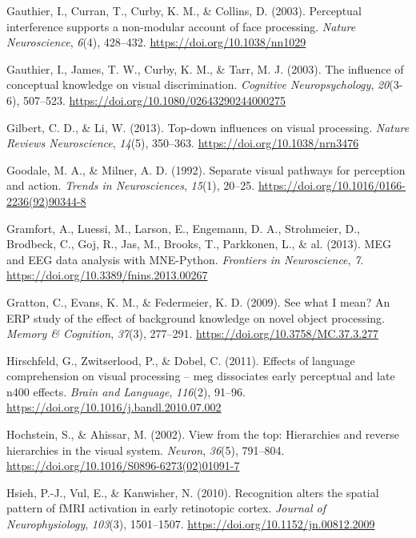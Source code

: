\documentclass[
  english,
  man,floatsintext]{apa7}
\begin{document}
\leavevmode\hypertarget{ref-gauthier2003a}{}%
Gauthier, I., Curran, T., Curby, K. M., \& Collins, D. (2003). Perceptual interference supports a non-modular account of face processing. \emph{Nature Neuroscience}, \emph{6}(4), 428--432. \url{https://doi.org/10.1038/nn1029}

\leavevmode\hypertarget{ref-gauthier2003}{}%
Gauthier, I., James, T. W., Curby, K. M., \& Tarr, M. J. (2003). The influence of conceptual knowledge on visual discrimination. \emph{Cognitive Neuropsychology}, \emph{20}(3-6), 507--523. \url{https://doi.org/10.1080/02643290244000275}

\leavevmode\hypertarget{ref-gilbert2013}{}%
Gilbert, C. D., \& Li, W. (2013). Top-down influences on visual processing. \emph{Nature Reviews Neuroscience}, \emph{14}(5), 350--363. \url{https://doi.org/10.1038/nrn3476}

\leavevmode\hypertarget{ref-goodale1992}{}%
Goodale, M. A., \& Milner, A. D. (1992). Separate visual pathways for perception and action. \emph{Trends in Neurosciences}, \emph{15}(1), 20--25. \url{https://doi.org/10.1016/0166-2236(92)90344-8}

\leavevmode\hypertarget{ref-gramfort2013}{}%
Gramfort, A., Luessi, M., Larson, E., Engemann, D. A., Strohmeier, D., Brodbeck, C., Goj, R., Jas, M., Brooks, T., Parkkonen, L., \& al. (2013). MEG and EEG data analysis with MNE-Python. \emph{Frontiers in Neuroscience}, \emph{7}. \url{https://doi.org/10.3389/fnins.2013.00267}

\leavevmode\hypertarget{ref-gratton2009}{}%
Gratton, C., Evans, K. M., \& Federmeier, K. D. (2009). See what I mean? An ERP study of the effect of background knowledge on novel object processing. \emph{Memory \& Cognition}, \emph{37}(3), 277--291. \url{https://doi.org/10.3758/MC.37.3.277}

\leavevmode\hypertarget{ref-hirschfeld2011}{}%
Hirschfeld, G., Zwitserlood, P., \& Dobel, C. (2011). Effects of language comprehension on visual processing -- meg dissociates early perceptual and late n400 effects. \emph{Brain and Language}, \emph{116}(2), 91--96. \url{https://doi.org/10.1016/j.bandl.2010.07.002}

\leavevmode\hypertarget{ref-hochstein2002}{}%
Hochstein, S., \& Ahissar, M. (2002). View from the top: Hierarchies and reverse hierarchies in the visual system. \emph{Neuron}, \emph{36}(5), 791--804. \url{https://doi.org/10.1016/S0896-6273(02)01091-7}

\leavevmode\hypertarget{ref-hsieh2010}{}%
Hsieh, P.-J., Vul, E., \& Kanwisher, N. (2010). Recognition alters the spatial pattern of fMRI activation in early retinotopic cortex. \emph{Journal of Neurophysiology}, \emph{103}(3), 1501--1507. \url{https://doi.org/10.1152/jn.00812.2009}
\end{document}
